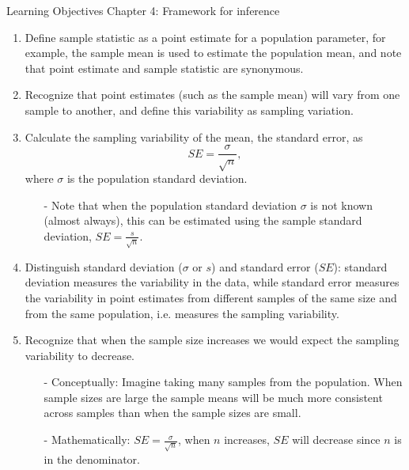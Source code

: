 \documentclass[11pt]{article}
\begin{document}
{\LARGE \textcolor{oiB}{Learning Objectives \hfill Chapter 4: Framework for inference}} \\

%

\begin{enumerate}
\renewcommand\labelenumi{\textcolor{light}{\textbf{LO \theenumi.}}}

\item Define sample statistic as a point estimate for a population parameter, for example, the sample mean is used to estimate the population mean, and note that point estimate and sample statistic are synonymous.

\item Recognize that point estimates (such as the sample mean) will vary from one sample to another, and define this variability as sampling variation.

\item Calculate the sampling variability of the mean, the standard error, as 
\[ SE = \frac{\sigma}{\sqrt{n}}, \] 
where $\sigma$ is the population standard deviation.
\begin{itemize}
\item[-] Note that when the population standard deviation $\sigma$ is not known (almost always), this can be estimated using the sample standard deviation, $SE = \frac{s}{\sqrt{n}}$.
\end{itemize}

\item Distinguish standard deviation ($\sigma$ or $s$) and standard error ($SE$): standard deviation measures the variability in the data, while standard error measures the variability in point estimates from different samples of the same size and from the same population, i.e. measures the sampling variability.

\item Recognize that when the sample size increases we would expect the sampling variability to decrease.
\begin{itemize}
\item[-] Conceptually: Imagine taking many samples from the population. When sample sizes are large the sample means will be much more consistent across samples than when the sample sizes are small.
\item[-] Mathematically: $SE = \frac{\sigma}{\sqrt{n}}$, when $n$ increases, $SE$ will decrease since $n$ is in the denominator.
\end{itemize}

\end{enumerate}
\end{document}
